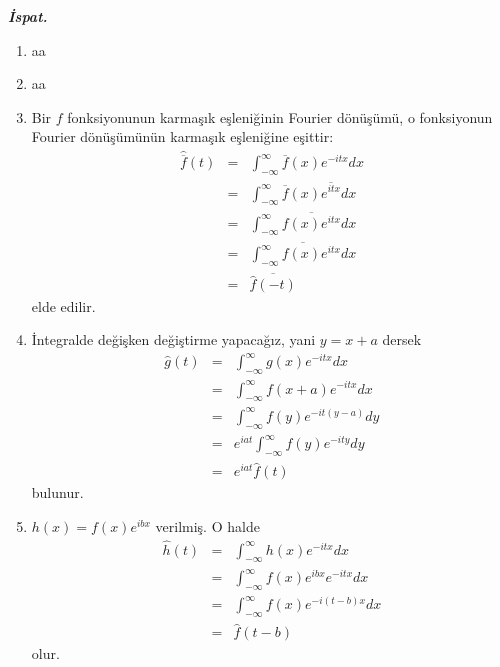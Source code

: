 \documentclass[a4paper, 9pt]{article}
\begin{document}
\textit{\textbf{İspat.}} 
\begin{enumerate}
	\item aa
	\item aa
	\item  Bir $f$ fonksiyonunun karmaşık eşleniğinin Fourier dönüşümü, o fonksiyonun Fourier dönüşümünün karmaşık eşleniğine eşittir:
		\begin{eqnarray*}
		\widehat{\overline{f}}(t)  &=&  \int_{-\infty }^{\infty } \overline{f}(x) e^{-itx}dx  \\ &=&  \int_{-\infty }^{\infty } \overline{f}(x) \overline{e^{itx}}dx\\ &=& \int_{-\infty }^{\infty } \overline{f(x)e^{itx}} dx \\ &=& \overline{\int_{-\infty }^{\infty } f(x)e^{itx} dx} \\ &=& \overline{\widehat{f}(-t)}  
		\end{eqnarray*}
	elde edilir.
	
	\item İntegralde değişken değiştirme yapacağız, yani $y=x+a$ dersek
		\begin{eqnarray*}
		\widehat{g}(t)  &=&  \int_{-\infty }^{\infty } g(x) e^{-itx}dx  \\ &=&  \int_{-\infty }^{\infty } {f}(x+a) e^{-itx}dx\\ &=& \int_{-\infty }^{\infty } f(y)e^{-it(y-a)} dy \\ &=& e^{iat}\int_{-\infty }^{\infty } f(y)e^{-ity} dy \\ &=& e^{iat}\widehat{f}(t)  
		\end{eqnarray*}
		bulunur.
		
	\item $h(x)=f(x)e^{ibx}$ verilmiş. O halde
		\begin{eqnarray*}
		\widehat{h}(t)  &=&  \int_{-\infty }^{\infty } h(x) e^{-itx}dx  \\ &=&  \int_{-\infty }^{\infty } {f}(x)e^{ibx} e^{-itx}dx\\ &=& \int_{-\infty }^{\infty } f(x)e^{-i(t-b)x} dx \\ &=& \widehat{f}(t-b)  
		\end{eqnarray*}
		olur.


\end{enumerate}
\end{document}
